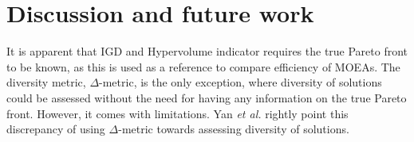 \documentclass[sigconf,nonacm]{acmart}
\begin{document}
\section{Discussion and future work}
It is apparent that IGD and Hypervolume indicator requires the true Pareto front to be known, as this is used as a reference to compare efficiency of MOEAs. The diversity metric, $\Delta$-metric, is the only exception, where diversity of solutions could be assessed without the need for having any information on the true Pareto front. However, it comes with limitations. Yan \textit{et al.} \cite{yan2007} rightly point this discrepancy of using $\Delta$-metric towards assessing diversity of solutions. 

 
\end{document}
